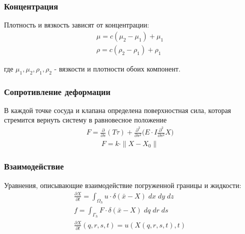 \documentclass[14pt]{beamer}
\begin{document}
\begin{frame}
\frametitle{Концентрация}
Плотность и вязкость зависят от концентрации:
\begin{gather}
    \label{eq:concentration_viscosity}
    \mu = c (\mu_2 - \mu_1) + \mu_1\\
    \label{eq:concentration_density}
    \rho = c (\rho_2 - \rho_1) + \rho_1
\end{gather}

где $\mu_1, \mu_2, \rho_1, \rho_2$ - вязкости и плотности обоих компонент.
\end{frame}

\begin{frame}
\frametitle{Сопротивление деформации}
В каждой точке сосуда и клапана определена поверхностная сила, которая стремится вернуть систему в равновесное положение
\begin{gather}
    \label{eq:strain_energy}
    F =  \frac{\partial}{\partial s}(T \tau) + \frac{\partial^2}{\partial s^2} \Big( E \cdot I \frac{\partial^2}{\partial s^2} X \Big)
\end{gather}
\begin{gather}
    \label{eq:define_boundary_force}
    F = k \cdot \|X - X_0\|
\end{gather}
\end{frame}

\begin{frame}
\frametitle{Взаимодействие}
Уравнения, описывающие взаимодействие погруженной границы и жидкости:
\begin{gather}
    \label{eq:ibm_velocity}
    \frac{\partial X}{\partial t} = \int_{\Omega_h} u \cdot \delta (\bar{x} - X)\; dx\; dy\; dz \\
    \label{eq:ibm_force}
    f = \int_{\Gamma_h} F \cdot \delta (\bar{x} - X)\; dq\; dr\; ds\\
    \label{eq:no_slip}
    \frac{\partial X}{\partial t} (q, r, s, t) = u(X(q, r, s, t), t)
\end{gather}
\end{frame}
\end{document}

